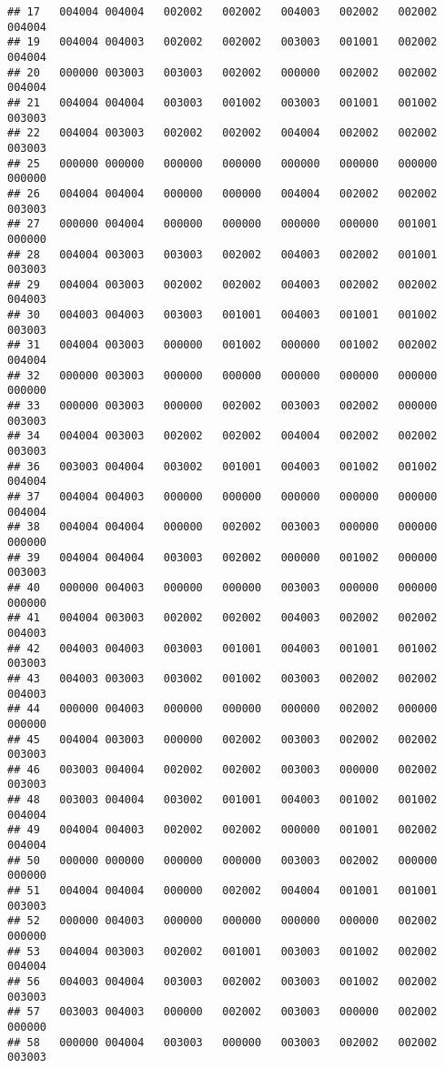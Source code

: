 \documentclass[
]{article}
\begin{document}
\begin{verbatim}
## 17   004004 004004   002002   002002   004003   002002   002002   004004
## 19   004004 004003   002002   002002   003003   001001   002002   004004
## 20   000000 003003   003003   002002   000000   002002   002002   004004
## 21   004004 004004   003003   001002   003003   001001   001002   003003
## 22   004004 003003   002002   002002   004004   002002   002002   003003
## 25   000000 000000   000000   000000   000000   000000   000000   000000
## 26   004004 004004   000000   000000   004004   002002   002002   003003
## 27   000000 004004   000000   000000   000000   000000   001001   000000
## 28   004004 003003   003003   002002   004003   002002   001001   003003
## 29   004004 003003   002002   002002   004003   002002   002002   004003
## 30   004003 004003   003003   001001   004003   001001   001002   003003
## 31   004004 003003   000000   001002   000000   001002   002002   004004
## 32   000000 003003   000000   000000   000000   000000   000000   000000
## 33   000000 003003   000000   002002   003003   002002   000000   003003
## 34   004004 003003   002002   002002   004004   002002   002002   003003
## 36   003003 004004   003002   001001   004003   001002   001002   004004
## 37   004004 004003   000000   000000   000000   000000   000000   004004
## 38   004004 004004   000000   002002   003003   000000   000000   000000
## 39   004004 004004   003003   002002   000000   001002   000000   003003
## 40   000000 004003   000000   000000   003003   000000   000000   000000
## 41   004004 003003   002002   002002   004003   002002   002002   004003
## 42   004003 004003   003003   001001   004003   001001   001002   003003
## 43   004003 003003   003002   001002   003003   002002   002002   004003
## 44   000000 004003   000000   000000   000000   002002   000000   000000
## 45   004004 003003   000000   002002   003003   002002   002002   003003
## 46   003003 004004   002002   002002   003003   000000   002002   003003
## 48   003003 004004   003002   001001   004003   001002   001002   004004
## 49   004004 004003   002002   002002   000000   001001   002002   004004
## 50   000000 000000   000000   000000   003003   002002   000000   000000
## 51   004004 004004   000000   002002   004004   001001   001001   003003
## 52   000000 004003   000000   000000   000000   000000   002002   000000
## 53   004004 003003   002002   001001   003003   001002   002002   004004
## 56   004003 004004   003003   002002   003003   001002   002002   003003
## 57   003003 004003   000000   002002   003003   000000   002002   000000
## 58   000000 004004   003003   000000   003003   002002   002002   003003

\end{verbatim}
\end{document}
